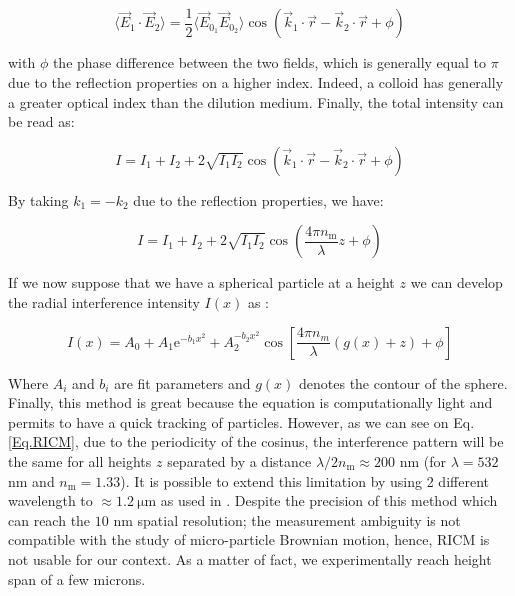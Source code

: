 \begin{equation}
	\langle \vec{E}_1 \cdot \vec{E}_2 \rangle = \frac{1}{2} \langle  \vec{E}_{0_1}  \vec{E}_{0_2} \rangle
	\cos 
	\left(
	\vec{k}_1 \cdot \vec{r} - \vec{k}_2 \cdot \vec{r} + \phi	
	\right)	
\end{equation}

with $\phi$ the phase difference between the two fields, which is generally equal to $\pi$ due to the reflection properties on a higher index. Indeed, a colloid has generally a greater optical index than the dilution medium.  Finally, the total intensity can be read as:


\begin{equation}
	I = I_1 + I_2 + 2 \sqrt{I_1 I_2} 
	\cos 
	\left(
	\vec{k}_1 \cdot \vec{r} - \vec{k}_2 \cdot \vec{r} + \phi	
	\right)
\end{equation}

By taking $k_1 = - k_2$ due to the reflection properties, we have:


\begin{equation}
	I = I_1 + I_2 + 2 \sqrt{I_1 I_2} 
	\cos 
	\left(
	\frac{4 \pi n_{\mathrm{m}}}{\lambda} z + \phi	
	\right)
\end{equation}


If we now suppose that we have a spherical particle at a height $z$ we can develop the radial interference intensity $I(x)$ as \cite{ raedler_measurement_1992}:

\begin{equation}
	I(x) = A_0 + A_1 \mathrm{e}^{-b_1 x^2} + A_2^{-b_2 x^2} \cos \left[ \frac{4\pi n_m}{\lambda}\left( g(x) + z \right) + \phi \right]
	\label{Eq.RICM}
\end{equation}

Where $A_i$ and $b_i$ are fit parameters and $g(x)$ denotes the contour of the sphere.
Finally, this method is great because the equation is computationally light and permits to have a quick tracking of particles. However, as we can see on Eq.\ref{Eq.RICM}, due to the periodicity of the cosinus, the interference pattern will be the same for all heights $z$ separated by a distance $\lambda / 2n_\mathrm{m} \approx 200 $ nm (for $\lambda = 532$ nm and $n_{\mathrm{m}} = 1.33$). It is possible to extend this limitation by using 2 different wavelength to $\approx 1.2 ~ \mathrm{\mu m}$ as used in \cite{davies_elastohydrodynamic_2018}. Despite the precision of this method which can reach the $10$ nm spatial resolution; the measurement ambiguity is not compatible with the study of  micro-particle Brownian motion, hence, \gls{RICM} is not usable for our context. As a matter of fact, we experimentally reach height span of a few microns. 



